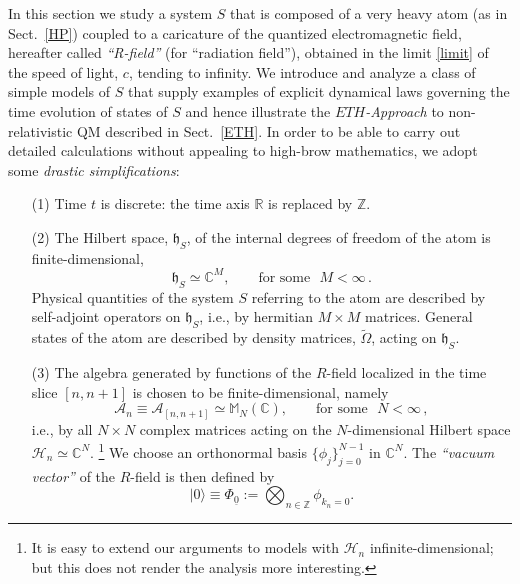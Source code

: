 \documentclass[a4paper,11pt]{article}
\begin{document}
In this section we study a system $S$ that is composed of a very heavy atom (as in Sect.~\ref{HP}) coupled to a 
caricature of the quantized electromagnetic field, hereafter called \textit{``R-field''} (for ``radiation field''), obtained 
in the limit \eqref{limit} of the speed of light, $c$, tending to infinity. We introduce and analyze a class of simple 
models of $S$ that supply examples of explicit dynamical laws governing the time evolution of states of $S$ and 
hence illustrate the \textit{$ETH$-Approach} to non-relativistic QM described in Sect.~\ref{ETH}. In order to be able 
to carry out detailed calculations without appealing to high-brow mathematics, we adopt some \textit{drastic simplifications}:
\begin{enumerate}
\item[(1)]{Time $t$ is discrete: the time axis $\mathbb{R}$ is replaced by $\mathbb{Z}$.}
\item[(2)]{ The Hilbert space, $\mathfrak{h}_S$, of the internal degrees of freedom of the atom is finite-dimensional,
\begin{equation}\label{atom}
\mathfrak{h}_S \simeq \mathbb{C}^{M}, \qquad \text{for some }\,\, M<\infty\,.
\end{equation}
Physical quantities of the system $S$ referring to the atom are described by self-adjoint operators on $\mathfrak{h}_S$, 
i.e., by hermitian $M\times M$ matrices. General states of the atom are described by density matrices, $\widetilde{\Omega}$, 
acting on $\mathfrak{h}_S$.} 
\item[(3)]{The algebra generated by functions of the $R$-field localized in the time slice $[n,n+1]$ is chosen to be finite-dimensional, namely
\begin{equation}\label{algebra at fixed time}
\mathcal{A}_{n}\equiv \mathcal{A}_{[n,n+1]} \simeq \mathbb{M}_{N}(\mathbb{C}), \qquad \text{for some  }\,\, N<\infty\,,
\end{equation}
i.e., by all $N\times N$ complex matrices acting on the $N$-dimensional Hilbert space \mbox{$\mathcal{H}_n \simeq 
\mathbb{C}^{N}$.} \footnote{It is easy to extend our arguments to models with $\mathcal{H}_n$ 
infinite-dimensional; but this does not render the analysis more interesting.} We choose an orthonormal basis 
$\big\{\phi_j\big\}_{j=0}^{N-1}$ in $\mathbb{C}^{N}$. The \textit{``vacuum vector''} of the $R$-field is then defined by
\begin{equation}\label{vacuum}
\vert 0 \rangle \equiv \Phi_{\underline{0}}:= \bigotimes_{n\in \mathbb{Z}} \phi_{k_n =0}.
\end{equation} 
}
\end{enumerate}
\end{document}
